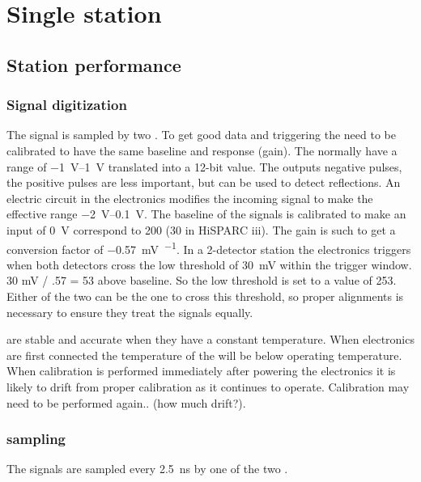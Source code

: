 \chapter{Single \hisparc station}
\label{ch:station}

\section{Station performance}

\subsection{Signal digitization}

The signal is sampled by two \adcs. To get good data and triggering the
\adcs need to be calibrated to have the same baseline and response
(gain). The \adcs normally have a range of \SIrange{-1}{1}{\volt}
translated into a 12-bit value. The \pmt outputs negative pulses, the
positive pulses are less important, but can be used to detect
reflections. An electric circuit in the \hisparc electronics modifies
the incoming signal to make the effective \adc range
\SIrange{-2}{0.1}{\volt}. The baseline of the signals is calibrated to
make an input of \SI{0}{\volt} correspond to \SI{200}{\adc} (30 in
HiSPARC iii). The gain is such to get a conversion factor of
\SI{-0.57}{\milli\volt\per\adc}. In a 2-detector station the \hisparc
electronics triggers when both detectors cross the low threshold of
\SI{30}{\milli\volt} within the trigger window. 30 mV / .57 = 53 above
baseline. So the low threshold is set to a value of \SI{253}{\adc}.
Either of the two \adcs can be the one to cross this threshold, so
proper \adc alignments is necessary to ensure they treat the signals
equally.

\adcs are stable and accurate when they have a constant temperature.
When \hisparc electronics are first connected the temperature of the
\adcs will be below operating temperature. When calibration is performed
immediately after powering the electronics it is likely to drift from
proper calibration as it continues to operate. Calibration may need to
be performed again.. (how much drift?).


\subsection{\adc sampling}

The \pmt signals are sampled every \SI{2.5}{\ns} by one of the
two \adcs.


